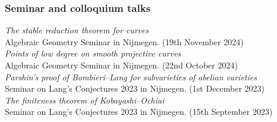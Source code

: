 \documentclass[paper=a4,fontsize=11pt,DIV=11,BCOR=3mm,pdftex]{scrartcl}
\begin{document}
\subsubsection*{Seminar and colloquium talks}

\textit{The stable reduction theorem for curves} \\
Algebraic Geometry Seminar in Nijmegen. (19th November 2024) \\

\textit{Points of low degree on smooth projective curves} \\
Algebraic Geometry Seminar in Nijmegen. (22nd October 2024) \\

\textit{Parshin's proof of Bombieri--Lang for subvarieties of abelian varieties} \\
Seminar on Lang's Conjectures 2023 in Nijmegen. (1st December 2023) \\

\textit{The finiteness theorem of Kobayashi--Ochiai} \\
Seminar on Lang's Conjectures 2023 in Nijmegen. (15th September 2023)
\end{document}
